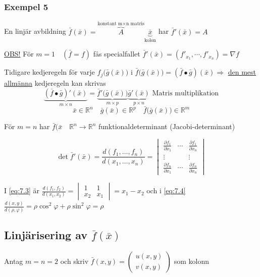 \documentclass{article}
\begin{document}
\subsubsection{Exempel 5}
En linjär avbildning \(\bar{f}(\bar{x}) = \overbrace{A}^{\text{konstant m}\times\text{n matris}}\underbrace{\bar{x}}_{\text{kolon}}\) har \(\bar{f}'(\bar{x}) = A\)
\newline

\underline{OBS!} För \(m=1 \quad (\bar{f} = f)\) fås specialfallet \(\bar{f}'(\bar{x}) = (f'_{x_1}, \cdots ,f'_{x_n}) = \nabla f\) \newline

Tidigare kedjeregeln för varje \(f_j\big(\bar{g}(\bar{x})\big)\) i \(\bar{f}\big(\bar{g}(\bar{x})\big) = (\bar{f} \bullet \bar{g})(\bar{x}) \Rightarrow\) \underline{den mest allmänna} kedjeregeln kan skrivas
\[
	\underbrace{(\bar{f} \bullet \bar{g})'(\bar{x})}_{m \times n} = \underbrace{\bar{f}'\big(\bar{g}(\bar{x})\big)}_{m \times p}\underbrace{\bar{g}'(\bar{x})}_{p \times n} \text{ Matris multiplikation}
\]
\[
	\bar{x} \in \mathbb{R}^n \quad \bar{g}(\bar{x}) \in \mathbb{R}^p \quad \bar{f}\big(\bar{g}(\bar{x})\big) \in \mathbb{R}^m
\]

För \underline{\(m=n\)} har \(\bar{f}(\bar{x} \quad \mathbb{R}^n \rightarrow \mathbb{R}^n\) funktionaldeterminant (Jacobi-determinant)

\[
	\det\bar{f}'(\bar{x}) = \frac{d(f_1, \ldots ,f_n)}{d(x_1, \ldots ,x_n)} = 
	\begin{vmatrix}
		\frac{\partial f_1}{\partial x_1} & \cdots & \frac{\partial f_1}{\partial x_n} \\
		\vdots & & \vdots \\
		\frac{\partial f_n}{\partial x_1} & \cdots & \frac{\partial f_n}{\partial x_n}
	\end{vmatrix}
\]

I \eqref{eq:7.3} är \(\frac{d(f_1,f_2)}{d(x_1,x_2)} = 
\begin{vmatrix}
	1 & 1 \\
	x_2 & x_1
\end{vmatrix}
= x_1-x_2\) och i \eqref{eq:7.4} \(\frac{d(x,y)}{d(\rho,\varphi)} = \rho\cos^2{\varphi} + \rho\sin^2{\varphi} = \rho\)

\subsection{Linjärisering av \texorpdfstring{\(\bar{f}(\bar{x})\)}{f(x)}}

Antag \(m=n=2\) och skriv \(\bar{f}(x,y) = 
\begin{pmatrix}
	u(x,y) \\
	v(x,y)
\end{pmatrix}\)
som kolonn \newline
\end{document}
